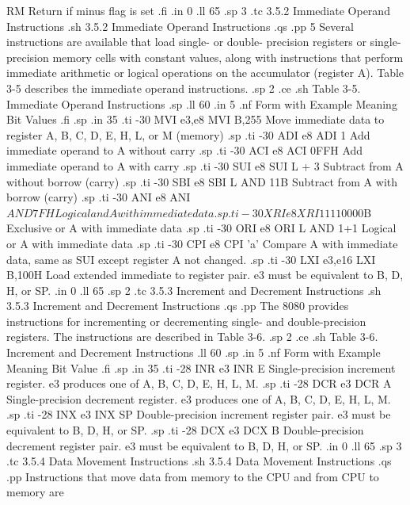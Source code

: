  RM                        Return if minus flag is set
.fi
.in 0
.ll 65
.sp 3
.tc         3.5.2  Immediate Operand Instructions
.sh
3.5.2  Immediate Operand Instructions
.qs
.pp 5
Several instructions are available that load single- or double-
precision registers or single-precision memory cells with 
constant values, along with instructions that perform immediate 
arithmetic or logical operations on the accumulator (register A).  
Table 3-5 describes the immediate operand instructions.  
.sp 2
.ce
.sh
Table 3-5.  Immediate Operand Instructions
.sp
.ll 60
.in 5
.nf
Form with       Example                Meaning
Bit Values
.fi
.sp
.in 35 
.ti -30
MVI e3,e8    MVI B,255        Move immediate data to register A, B, C, D, 
E, H, L, or M (memory)
.sp
.ti -30
ADI e8       ADI 1            Add immediate operand to A without carry
.sp
.ti -30
ACI e8       ACI 0FFH         Add immediate operand to A with carry
.sp
.ti -30
SUI e8       SUI L + 3        Subtract from A without borrow (carry)
.sp
.ti -30
SBI e8       SBI L AND 11B    Subtract from A with borrow (carry)
.sp
.ti -30
ANI e8       ANI $ AND 7FH    Logical and A with immediate data
.sp
.ti -30
XRI e8       XRI 1111$0000B   Exclusive or A with immediate data
.sp
.ti -30
ORI e8       ORI L AND 1+1    Logical or A with immediate data
.sp
.ti -30
CPI e8       CPI 'a'          Compare A with immediate data, same 
as SUI except register A not changed.
.sp
.ti -30
LXI e3,e16   LXI B,100H       Load extended immediate to register 
pair.  e3 must be equivalent to B, D, H, or SP.
.in 0
.ll 65
.sp 2
.tc         3.5.3  Increment and Decrement Instructions
.sh
3.5.3  Increment and Decrement Instructions
.qs
.pp
The 8080 provides instructions for incrementing or decrementing 
single- and double-precision registers.  The instructions are 
described in Table 3-6.
.sp 2
.ce
.sh
Table 3-6.  Increment and Decrement Instructions
.ll 60
.sp
.in 5
.nf
Form with         Example              Meaning
Bit Value
.fi
.sp
.in 35
.ti -28
INR e3          INR E       Single-precision increment 
register.  e3 produces one of A, B, C, D, E, H, L, M.
.sp
.ti -28
DCR e3          DCR A       Single-precision decrement 
register.  e3 produces one of A, B, C, D, E, H, L, M.
.sp
.ti -28
INX e3          INX SP      Double-precision increment register 
pair.  e3 must be equivalent to B, D, H, or SP.
.sp
.ti -28
DCX e3          DCX B       Double-precision decrement register 
pair.  e3 must be equivalent to B, D, H, or SP.
.in 0
.ll 65
.sp 3
.tc         3.5.4  Data Movement Instructions
.sh
3.5.4  Data Movement Instructions
.qs
.pp
Instructions that move data from memory to the CPU and from CPU to memory are 

